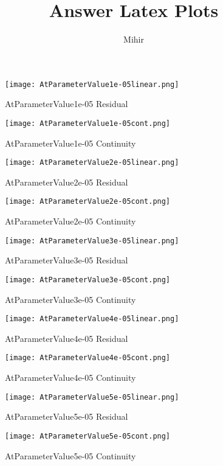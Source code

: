\documentclass[12pt]{article}
\title{Answer Latex Plots}
\author{Mihir}
\begin{document}
\maketitle
\begin{figure}[H]
	\texttt{[image: AtParameterValue1e-05linear.png]}
	\caption{AtParameterValue1e-05 Residual}
	\label{AtParameterValue1e-05linear}
\end{figure}
\begin{figure}[H]
	\texttt{[image: AtParameterValue1e-05cont.png]}
	\caption{AtParameterValue1e-05 Continuity}
	\label{AtParameterValue1e-05cont}
\end{figure}
\begin{figure}[H]
	\texttt{[image: AtParameterValue2e-05linear.png]}
	\caption{AtParameterValue2e-05 Residual}
	\label{AtParameterValue2e-05linear}
\end{figure}
\begin{figure}[H]
	\texttt{[image: AtParameterValue2e-05cont.png]}
	\caption{AtParameterValue2e-05 Continuity}
	\label{AtParameterValue2e-05cont}
\end{figure}
\begin{figure}[H]
	\texttt{[image: AtParameterValue3e-05linear.png]}
	\caption{AtParameterValue3e-05 Residual}
	\label{AtParameterValue3e-05linear}
\end{figure}
\begin{figure}[H]
	\texttt{[image: AtParameterValue3e-05cont.png]}
	\caption{AtParameterValue3e-05 Continuity}
	\label{AtParameterValue3e-05cont}
\end{figure}
\begin{figure}[H]
	\texttt{[image: AtParameterValue4e-05linear.png]}
	\caption{AtParameterValue4e-05 Residual}
	\label{AtParameterValue4e-05linear}
\end{figure}
\begin{figure}[H]
	\texttt{[image: AtParameterValue4e-05cont.png]}
	\caption{AtParameterValue4e-05 Continuity}
	\label{AtParameterValue4e-05cont}
\end{figure}
\begin{figure}[H]
	\texttt{[image: AtParameterValue5e-05linear.png]}
	\caption{AtParameterValue5e-05 Residual}
	\label{AtParameterValue5e-05linear}
\end{figure}
\begin{figure}[H]
	\texttt{[image: AtParameterValue5e-05cont.png]}
	\caption{AtParameterValue5e-05 Continuity}
	\label{AtParameterValue5e-05cont}
\end{figure}
\end{document}
